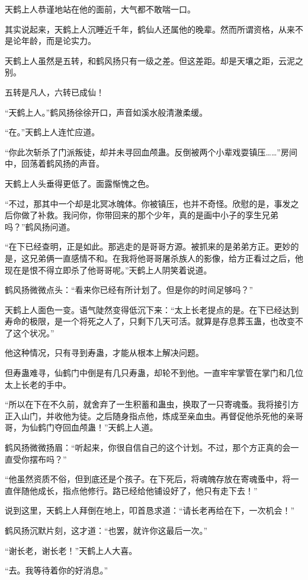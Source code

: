 \begin{this_body}
天鹤上人恭谨地站在他的面前，大气都不敢喘一口。

其实说起来，天鹤上人沉睡近千年，鹤仙人还属他的晚辈。然而所谓资格，从来不是论年龄，而是论实力。

天鹤上人虽然是五转，和鹤风扬只有一级之差。但这差距。却是天壤之距，云泥之别。

五转是凡人，六转已成仙！

“天鹤上人。”鹤风扬徐徐开口，声音如溪水般清澈柔缓。

“在。”天鹤上人连忙应道。

“你此次斩杀了门派叛徒，却并未寻回血颅蛊。反倒被两个小辈戏耍镇压……”房间中，回荡着鹤风扬的声音。

天鹤上人头垂得更低了。面露惭愧之色。

“不过，那其中一个却是北冥冰魄体。你被镇压，也并不奇怪。欣慰的是，事发之后你做了补救。我问你，你带回来的那个少年，真的是画中小子的孪生兄弟吗？”鹤风扬问道。

“在下已经查明，正是如此。那逃走的是哥哥方源。被抓来的是弟弟方正。更妙的是，这兄弟俩一直感情不和。在我将他哥哥屠杀族人的影像，给方正看过之后，他现在是恨不得立即杀了他哥哥呢。”天鹤上人阴笑着说道。

鹤风扬微微点头：“看来你已经有所计划了。但是你的时间足够吗？”

天鹤上人面色一变。语气陡然变得低沉下来：“太上长老提点的是。在下已经达到寿命的极限，是一个将死之人了，只剩下几天可活。就算是存息葬玉蛊，也改变不了这个状况。”

他这种情况，只有寻到寿蛊，才能从根本上解决问题。

但寿蛊难寻，仙鹤门中倒是有几只寿蛊，却轮不到他。一直牢牢掌管在掌门和几位太上长老的手中。

“所以在下在不久前，就舍弃了一生积蓄和蛊虫，换取了一只寄魂蚤。我将接引方正入山门，并收他为徒。之后随身指点他，炼成至亲血虫。再督促他杀死他的亲哥哥，为仙鹤门夺回血颅蛊！”天鹤上人道。

鹤风扬微微扬眉：“听起来，你很自信自己的这个计划。不过，那个方正真的会一直受你摆布吗？”

“他虽然资质不俗，但到底还是个孩子。在下死后，将魂魄存放在寄魂蚤中，将一直伴随他成长，指点他修行。路已经给他铺设好了，他只有走下去！”

说到这里，天鹤上人拜倒在地上，叩首恳求道：“请长老再给在下，一次机会！”

鹤风扬沉默片刻，这才道：“也罢，就许你这最后一次。”

“谢长老，谢长老！”天鹤上人大喜。

“去。我等待着你的好消息。”


\end{this_body}
